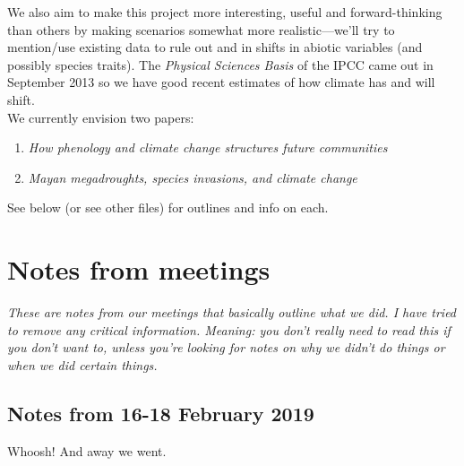 \documentclass[11pt,a4paper,oneside]{article}
\begin{document}
\noindent We also aim to make  this project more
interesting, useful and forward-thinking than others by making
scenarios somewhat more realistic---we'll try to mention/use
existing data to rule out and in shifts in abiotic variables (and
possibly species traits). The \emph{Physical Sciences Basis} of the IPCC came out in September 2013 so we have good recent estimates of how climate has and will shift.\\

 We currently envision two papers: 
\begin{enumerate}
\item \emph{How phenology and climate change structures future communities}
\item \emph{Mayan megadroughts, species invasions, and climate change} 
\end{enumerate}
See below (or see other files) for outlines and info on each.

\section{Notes from meetings}
\emph{These are notes from our meetings that basically outline what we did. I have tried to remove any critical information. Meaning: you don't really need to read this if you don't want to, unless you're looking for notes on why we didn't do things or when we did certain things.}

\subsection{Notes from 16-18 February 2019}
Whoosh! And away we went. \\
\end{document}
